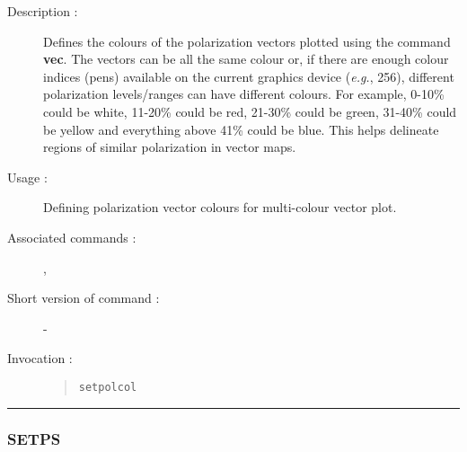 \begin{description}

\item[Description :] Defines the colours of the polarization vectors
plotted using the command {\bf vec}.  The vectors can be all the same
colour or, if there are enough colour indices (pens) available on the
current graphics device (\emph{e.g.}, 256), different polarization
levels/ranges can have different colours. For example, 0-10\% could be
white, 11-20\% could be red, 21-30\% could be green, 31-40\% could be
yellow and everything above 41\% could be blue.  This helps delineate
regions of similar polarization in vector maps.

\item[Usage :] Defining polarization vector colours for multi-colour
vector plot.

\item[Associated commands :] {\tt {}}, 
{\tt {}}

\item[Short version of command :] -
\item[Invocation :]

\begin{quote}{\tt  setpolcol }\end{quote}

\end{description}

\hrule 
\subsubsection*{\label{SETPS}SETPS}

